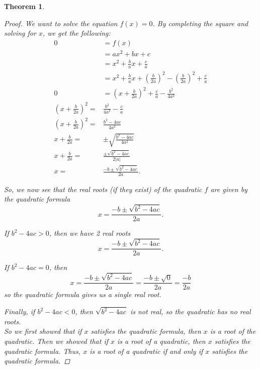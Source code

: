 \documentclass[12pt, letterpaper]{article}
\newtheorem{thm}{Theorem}[section]
\theoremstyle{definition}
\begin{document}
\begin{thm}
\begin{proof}
        We want to solve the equation \(f(x) = 0\). By completing the square
        \cite{wiki:completing_the_square} and solving for \(x\), we get the following:
        \begin{align*}
          0 &= f(x) \\
            &= ax^2 + bx + c \\
            &= x^2 + \frac{b}{a}x + \frac{c}{a} \\
            &= x^2 + \frac{b}{a}x + \left(\frac{b}{2a}\right)^2 - \left(\frac{b}{2a}\right)^2
            + \frac{c}{a} \\
          0 &= \left(x + \frac{b}{2a}\right)^2 + \frac{c}{a} - \frac{b^2}{4a^2} \\
          \left(x + \frac{b}{2a}\right)^2 =& \frac{b^2}{4a^2} - \frac{c}{a} \\
          \left(x + \frac{b}{2a}\right)^2 =& \frac{b^2 - 4a c}{4a^2}\\
          x + \frac{b}{2a} =& \pm \sqrt{\frac{b^2 - 4a c}{4a^2}} \\
          x + \frac{b}{2a} =& \frac{\pm \sqrt{b^2 - 4a c}}{2|a|} \\
          x =& \frac{-b \pm \sqrt{b^2 - 4a c}}{2a}.
        \end{align*}

        So, we now see that the real roots (if they exist) of the quadratic $f$ are given by the
        quadratic formula \[x = \frac{-b \pm \sqrt{b^2 - 4a c}}{2a}.\]

        If \(b^2 - 4a c > 0\), then we have 2 real roots
        \[x = \frac{-b \pm \sqrt{b^2 - 4a c}}{2a}.\]

        If \(b^2 - 4a c = 0\), then
        \[x = \frac{-b \pm \sqrt{b^2 - 4a c}}{2a} = \frac{-b \pm \sqrt{0}}{2a} = \frac{-b}{2a}\]
        so the quadratic formula gives us a single real root.

        Finally, if \(b^2 - 4a c < 0\), then \(\sqrt{b^2 - 4ac}\) is not real, so
        the quadratic has no real roots. \\

        So we first showed that if \(x\) satisfies the quadratic formula, then \(x\) is a root
        of the quadratic.
        Then we showed that if \(x\) is a root of a quadratic, then \(x\) satisfies the quadratic
        formula. Thus, \(x\) is a root of a quadratic if and only if \(x\) satisfies the
        quadratic formula.
    \end{proof}
\end{thm}
\end{document}
